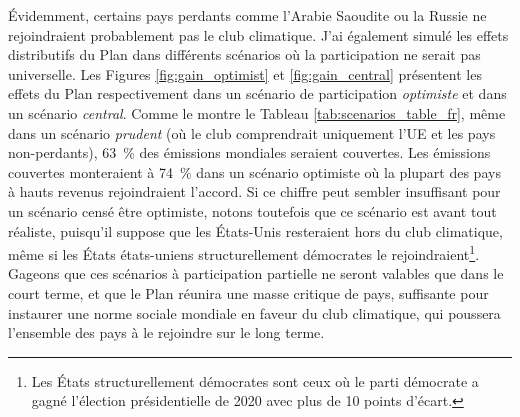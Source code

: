 \documentclass[a5paper,french,openany]{memoir}
\begin{document}
Évidemment, certains pays perdants comme l'Arabie Saoudite ou la Russie ne rejoindraient probablement pas le club climatique. J'ai également simulé les effets distributifs du Plan dans différents scénarios où la participation ne serait pas universelle. Les Figures \ref{fig:gain_optimist} et \ref{fig:gain_central} présentent les effets du Plan respectivement dans un scénario de participation \textit{optimiste} et dans un scénario \textit{central}. Comme le montre le Tableau \ref{tab:scenarios_table_fr}, même dans un scénario \textit{prudent} (où le club comprendrait uniquement l'UE et les pays non-perdants), 63~\% des émissions mondiales seraient couvertes. Les émissions couvertes monteraient à 74~\% dans un scénario optimiste où la plupart des pays à hauts revenus rejoindraient l'accord. Si ce chiffre peut sembler insuffisant pour un scénario censé être optimiste, notons toutefois que ce scénario est avant tout réaliste, puisqu'il suppose que les États-Unis resteraient hors du club climatique, même si les États états-uniens structurellement démocrates le rejoindraient\footnote{Les États structurellement démocrates sont ceux où le parti démocrate a gagné l'élection présidentielle de 2020 avec plus de 10 points d'écart.}. Gageons que ces scénarios à participation partielle ne seront valables que dans le court terme, et que le Plan réunira une masse critique de pays, suffisante pour instaurer une norme sociale mondiale en faveur du club climatique, qui poussera l'ensemble des pays à le rejoindre sur le long terme.
\end{document}
